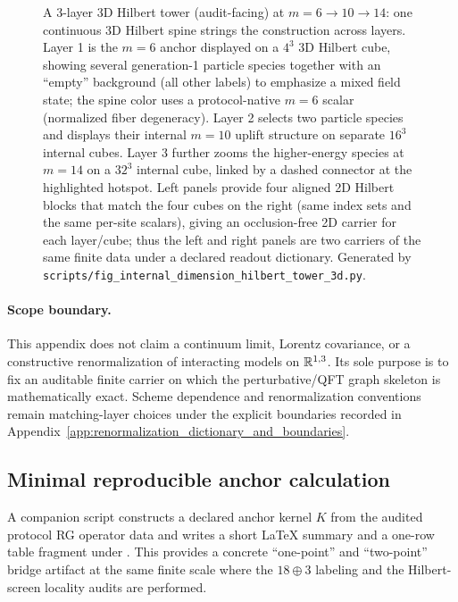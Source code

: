 \begin{figure}[H]
\centering
{}
\caption{A 3-layer 3D Hilbert tower (audit-facing) at $m=6\to 10\to 14$: one continuous 3D Hilbert spine strings the construction across layers. Layer 1 is the $m=6$ anchor displayed on a $4^3$ 3D Hilbert cube, showing several generation-1 particle species together with an ``empty'' background (all other labels) to emphasize a mixed field state; the spine color uses a protocol-native $m=6$ scalar (normalized fiber degeneracy). Layer 2 selects two particle species and displays their internal $m=10$ uplift structure on separate $16^3$ internal cubes. Layer 3 further zooms the higher-energy species at $m=14$ on a $32^3$ internal cube, linked by a dashed connector at the highlighted hotspot. Left panels provide four aligned 2D Hilbert blocks that match the four cubes on the right (same index sets and the same per-site scalars), giving an occlusion-free 2D carrier for each layer/cube; thus the left and right panels are two carriers of the same finite data under a declared readout dictionary. Generated by \texttt{scripts/fig\_internal\_dimension\_hilbert\_tower\_3d.py}.}
\label{fig:internal_dimension_hilbert_tower_3d}
\end{figure}

\paragraph{Scope boundary.}
\AuditTag This appendix does not claim a continuum limit, Lorentz covariance, or a constructive renormalization of interacting models on $\mathbb{R}^{1,3}$.
Its sole purpose is to fix an auditable finite carrier on which the perturbative/QFT graph skeleton is mathematically exact.
Scheme dependence and renormalization conventions remain matching-layer choices under the explicit boundaries recorded in Appendix~\ref{app:renormalization_dictionary_and_boundaries}.

\subsection{Minimal reproducible anchor calculation}
\AuditTag A companion script  constructs a declared anchor kernel $K$ from the audited protocol RG operator data and writes a short \LaTeX{} summary and a one-row table fragment under .
This provides a concrete ``one-point'' and ``two-point'' bridge artifact at the same finite scale where the $18\oplus 3$ labeling and the Hilbert-screen locality audits are performed.

